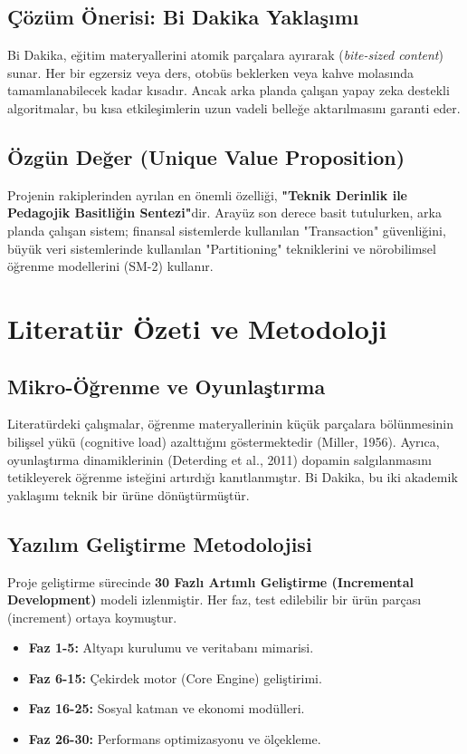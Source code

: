 \documentclass[12pt,a4paper]{report}
\begin{document}
\section{Çözüm Önerisi: Bi Dakika Yaklaşımı}
Bi Dakika, eğitim materyallerini atomik parçalara ayırarak (\textit{bite-sized content}) sunar. Her bir egzersiz veya ders, otobüs beklerken veya kahve molasında tamamlanabilecek kadar kısadır. Ancak arka planda çalışan yapay zeka destekli algoritmalar, bu kısa etkileşimlerin uzun vadeli belleğe aktarılmasını garanti eder.

\section{Özgün Değer (Unique Value Proposition)}
Projenin rakiplerinden ayrılan en önemli özelliği, \textbf{"Teknik Derinlik ile Pedagojik Basitliğin Sentezi"}dir. Arayüz son derece basit tutulurken, arka planda çalışan sistem; finansal sistemlerde kullanılan "Transaction" güvenliğini, büyük veri sistemlerinde kullanılan "Partitioning" tekniklerini ve nörobilimsel öğrenme modellerini (SM-2) kullanır.

\chapter{Literatür Özeti ve Metodoloji}

\section{Mikro-Öğrenme ve Oyunlaştırma}
Literatürdeki çalışmalar, öğrenme materyallerinin küçük parçalara bölünmesinin bilişsel yükü (cognitive load) azalttığını göstermektedir (Miller, 1956). Ayrıca, oyunlaştırma dinamiklerinin (Deterding et al., 2011) dopamin salgılanmasını tetikleyerek öğrenme isteğini artırdığı kanıtlanmıştır. Bi Dakika, bu iki akademik yaklaşımı teknik bir ürüne dönüştürmüştür.

\section{Yazılım Geliştirme Metodolojisi}
Proje geliştirme sürecinde \textbf{30 Fazlı Artımlı Geliştirme (Incremental Development)} modeli izlenmiştir. Her faz, test edilebilir bir ürün parçası (increment) ortaya koymuştur.
\begin{itemize}
    \item \textbf{Faz 1-5:} Altyapı kurulumu ve veritabanı mimarisi.
    \item \textbf{Faz 6-15:} Çekirdek motor (Core Engine) geliştirimi.
    \item \textbf{Faz 16-25:} Sosyal katman ve ekonomi modülleri.
    \item \textbf{Faz 26-30:} Performans optimizasyonu ve ölçekleme.
\end{itemize}
\end{document}
